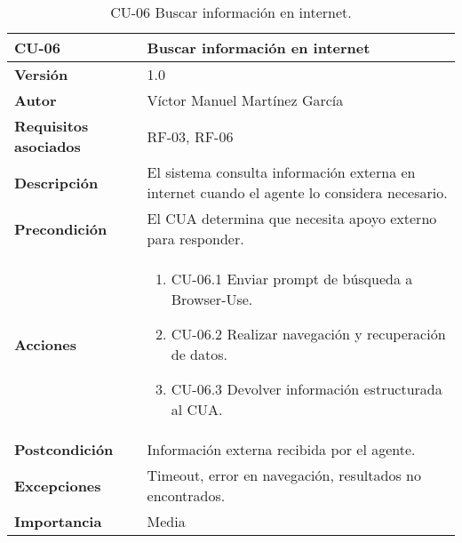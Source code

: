 \begin{table}[p]
    \centering
    \begin{tabularx}{\linewidth}{ p{} p{} }
        \toprule
        \textbf{CU-06}    & \textbf{Buscar información en internet}\\
        \toprule
        \textbf{Versión}              & 1.0 \\
        \textbf{Autor}                & Víctor Manuel Martínez García \\
        \textbf{Requisitos asociados} & RF-03, RF-06 \\
        \textbf{Descripción}          & El sistema consulta información externa en internet cuando el agente lo considera necesario.\\
        \textbf{Precondición}         & El CUA determina que necesita apoyo externo para responder.\\
        \textbf{Acciones}             &
        \begin{enumerate}
          \item CU-06.1 Enviar prompt de búsqueda a Browser-Use.
          \item CU-06.2 Realizar navegación y recuperación de datos.
          \item CU-06.3 Devolver información estructurada al CUA.
        \end{enumerate}\\
        \textbf{Postcondición}        & Información externa recibida por el agente.\\
        \textbf{Excepciones}          & Timeout, error en navegación, resultados no encontrados.\\
        \textbf{Importancia}          & Media \\
        \bottomrule
    \end{tabularx}
    \caption{CU-06 Buscar información en internet.}
    \label{CU-06 Buscar Informacion de internet}
\end{table}

